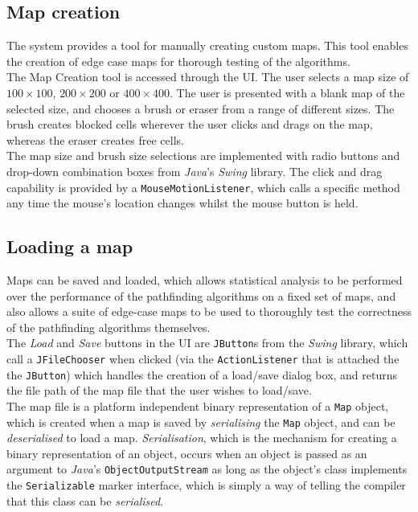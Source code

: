 \documentclass[12pt,notitlepage]{report}
\begin{document}
\subsection{Map creation}

The system provides a tool for manually creating custom maps. This tool enables the creation of edge case maps for thorough testing of the algorithms.\\

\noindent
The Map Creation tool is accessed through the UI. The user selects a map size of $100 \times 100$, $200 \times 200$ or $400 \times 400$. The user is presented with a blank map of the selected size, and chooses a brush or eraser from a range of different sizes. The brush creates blocked cells wherever the user clicks and drags on the map, whereas the eraser creates free cells.\\

\noindent
The map size and brush size selections are implemented with radio buttons and drop-down combination boxes from {\em Java}'s {\em Swing} library. The click and drag capability is provided by a {\tt MouseMotionListener}, which calls a specific method any time the mouse's location changes whilst the mouse button is held.

\subsection{Loading a map}
Maps can be saved and loaded, which allows statistical analysis to be performed over the performance of the pathfinding algorithms on a fixed set of maps, and also allows a suite of edge-case maps to be used to thoroughly test the correctness of the pathfinding algorithms themselves.\\

\noindent
The {\em Load} and {\em Save} buttons in the UI are {\tt JButton}s from the {\em Swing} library, which call a {\tt JFileChooser} when clicked (via the {\tt ActionListener} that is attached the the {\tt JButton}) which handles the creation of a load/save dialog box, and returns the file path of the map file that the user wishes to load/save.\\

\noindent
The map file is a platform independent binary representation of a {\tt Map} object, which is created when a map is saved by {\em serialising} the {\tt Map} object, and can be {\em deserialised} to load a map. {\em Serialisation}, which is the mechanism for creating a binary representation of an object, occurs when an object is passed as an argument to {\em Java}'s {\tt ObjectOutputStream} as long as the object's class implements the {\tt Serializable} marker interface, which is simply a way of telling the compiler that this class can be {\em serialised}.
\end{document}
